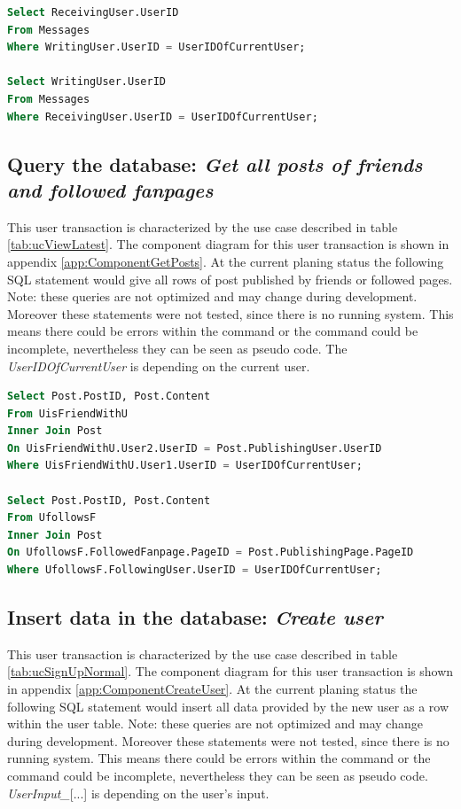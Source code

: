 \documentclass[11pt,a4paper]{report}
\begin{document}
\begin{lstlisting}[frame=single, language=SQL, caption=\emph{Get all conversation} SQL statement, keepspaces=true, breaklines=true]
Select ReceivingUser.UserID
From Messages
Where WritingUser.UserID = UserIDOfCurrentUser;

Select WritingUser.UserID
From Messages
Where ReceivingUser.UserID = UserIDOfCurrentUser;
\end{lstlisting}

\subsection{Query the database: \emph{Get all posts of friends and followed fanpages}}
This user transaction is characterized by the use case described in table \vref{tab:ucViewLatest}. The component diagram for this user transaction is shown in appendix \vref{app:ComponentGetPosts}. At the current planing status the following SQL statement would give all rows of post published by friends or followed pages. Note: these queries are not optimized and may change during development. Moreover these statements were not tested, since there is no running system. This means there could be errors within the command or the command could be incomplete, nevertheless they can be seen as pseudo code. The \emph{UserIDOfCurrentUser} is depending on the current user.

\begin{lstlisting}[frame=single, language=SQL, caption=\emph{Get all posts of friends and followed fanpages} SQL statement, keepspaces=true, breaklines=true]
Select Post.PostID, Post.Content
From UisFriendWithU
Inner Join Post
On UisFriendWithU.User2.UserID = Post.PublishingUser.UserID
Where UisFriendWithU.User1.UserID = UserIDOfCurrentUser;

Select Post.PostID, Post.Content
From UfollowsF
Inner Join Post
On UfollowsF.FollowedFanpage.PageID = Post.PublishingPage.PageID
Where UfollowsF.FollowingUser.UserID = UserIDOfCurrentUser;
\end{lstlisting}

\subsection{Insert data in the database: \emph{Create user}}
This user transaction is characterized by the use case described in table \vref{tab:ucSignUpNormal}. The component diagram for this user transaction is shown in appendix \vref{app:ComponentCreateUser}. At the current planing status the following SQL statement would insert all data provided by the new user as a row within the user table. Note: these queries are not optimized and may change during development. Moreover these statements were not tested, since there is no running system. This means there could be errors within the command or the command could be incomplete, nevertheless they can be seen as pseudo code. \emph{UserInput\_}[...] is depending on the user's input.
\end{document}
